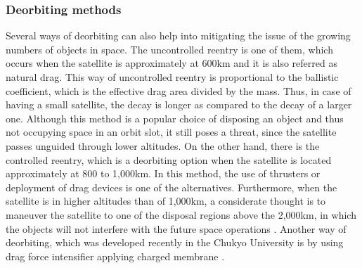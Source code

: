 \bigskip
\subsubsection{Deorbiting methods}
Several ways of deorbiting can also help into mitigating the issue of the growing numbers of objects in space. The uncontrolled reentry is one of them, which occurs when the satellite is approximately at 600km and it is also referred as natural drag. This way of uncontrolled reentry is proportional to the ballistic coefficient, which is the effective drag area divided by the mass. Thus, in case of having a small satellite, the decay is longer as compared to the decay of a larger one. Although this method is a popular choice of disposing an object and thus not occupying space in an orbit slot, it still poses a threat, since the satellite passes unguided through lower altitudes. On the other hand, there is the controlled reentry, which is a deorbiting option when the satellite is located approximately at 800 to 1,000km. In this method, the use of thrusters or deployment of drag devices is one of the alternatives. Furthermore, when the satellite is in higher altitudes than of 1,000km, a considerate thought is to maneuver the satellite to one of the disposal regions above the 2,000km, in which the objects will not interfere with the future space operations \cite{NASA}. Another way of deorbiting, which was developed recently in the Chukyo University is by using drag force intensifier applying charged membrane \cite{muranaka}.


\bigskip
